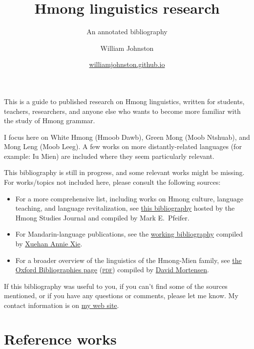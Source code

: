 \documentclass[11pt,oneside,DIV=9]{scrartcl}
\title{Hmong linguistics research}
\subtitle{An annotated bibliography}
\author{William Johnston}
\date{\normalsize\href{williamjohnston.github.io}{williamjohnston.github.io}}
\begin{document}
\maketitle
\raggedbottom

\noindent This is a guide to published research on Hmong linguistics, written for students, teachers, researchers, and anyone else who wants to become more familiar with the study of Hmong grammar. 

I focus here on White Hmong (Hmoob Dawb), Green Mong (Moob Ntshuab), and Mong Leng (Moob Leeg). A few works on more distantly-related languages (for example: Iu Mien) are included where they seem particularly relevant. 

This bibliography is still in progress, and some relevant works might be missing. For works/topics not included here, please consult the following sources:

\begin{itemize}
\item For a more comprehensive list, including works on Hmong culture, language teaching, and language revitalization, see \href{https://www.hmongstudiesjournal.org/the-hmong-language.html}{this bibliography} hosted by the Hmong Studies Journal and compiled by Mark E.\ Pfeifer. 
\item	For Mandarin-language publications, see the \href{https://sites.google.com/view/anniexie/language-documentation}{working bibliography} compiled by \href{https://sites.google.com/view/anniexie/about}{Xuehan Annie Xie}.
\item For a broader overview of the linguistics of the Hmong-Mien family, see \href{https://www.oxfordbibliographies.com/view/document/obo-9780199772810/obo-9780199772810-0173.xml}{the Oxford Bibliographies page} (\href{https://williamjohnston.github.io/files/Mortensen-2014.pdf}{\textsc{pdf}}) compiled by \href{https://www.cs.cmu.edu/~dmortens/}{David Mortensen}.
\end{itemize}

If this bibliography was useful to you, if you can't find some of the sources mentioned, or if you have any questions or comments, please let me know. My contact information is on \href{williamjohnston.github.io}{my web site}.

\newpage
\tableofcontents
\newpage 

\section{Reference works}
\end{document}
